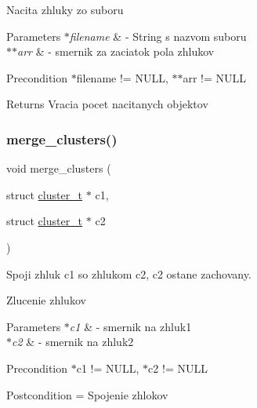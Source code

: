Nacita zhluky zo suboru 
\begin{DoxyParams}{Parameters}
{\em $\ast$filename} & -\/ String s nazvom suboru \\
\hline
{\em $\ast$$\ast$arr} & -\/ smernik za zaciatok pola zhlukov \\
\hline
\end{DoxyParams}
\begin{DoxyPrecond}{Precondition}
$\ast$filename != N\+U\+LL, $\ast$$\ast$arr != N\+U\+LL 
\end{DoxyPrecond}
\begin{DoxyReturn}{Returns}
Vracia pocet nacitanych objektov 
\end{DoxyReturn}
\hypertarget{group___praca_gac39a25fdec1f4952ec92ee5407893158}{}\label{group___praca_gac39a25fdec1f4952ec92ee5407893158} 
\subsubsection{\texorpdfstring{merge\+\_\+clusters()}{merge\_clusters()}}
{\footnotesize\ttfamily void merge\+\_\+clusters (\begin{DoxyParamCaption}\item[{struct \hyperlink{structcluster__t}{cluster\+\_\+t} $\ast$}]{c1,  }\item[{struct \hyperlink{structcluster__t}{cluster\+\_\+t} $\ast$}]{c2 }\end{DoxyParamCaption})}



Spoji zhluk c1 so zhlukom c2, c2 ostane zachovany. 

Zlucenie zhlukov 
\begin{DoxyParams}{Parameters}
{\em $\ast$c1} & -\/ smernik na zhluk1 \\
\hline
{\em $\ast$c2} & -\/ smernik na zhluk2 \\
\hline
\end{DoxyParams}
\begin{DoxyPrecond}{Precondition}
$\ast$c1 != N\+U\+LL, $\ast$c2 != N\+U\+LL 
\end{DoxyPrecond}
\begin{DoxyPostcond}{Postcondition}
= Spojenie zhlokov 
\end{DoxyPostcond}
\hypertarget{group___praca_ga703ce6afddf65026b68645bc5394405b}{}\label{group___praca_ga703ce6afddf65026b68645bc5394405b} 
